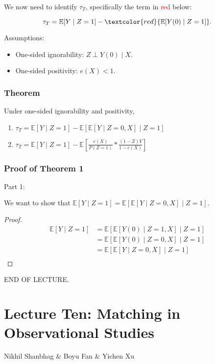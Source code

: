 We now need to identify $\tau_T$, specifically the term in \textcolor{red}{red} below:

\[\tau_T=\mathbb{E}[Y\mid Z=1]-\textcolor{red}{\mathbb{E}[Y(0)\mid Z=1]}.\]

Assumptions:
\begin{itemize}
    \item One-sided ignorability: $Z\perp Y(0)\mid X$.
    \item One-sided positivity: $e(X)<1$.
\end{itemize}

\subsubsection{Theorem}

Under one-sided ignorability and positivity,
\begin{enumerate}
    \item $\tau_T=\mathbb{E}[Y\mid Z=1]-\mathbb{E}\left[\mathbb{E}[Y\mid Z=0,X]\mid Z=1\right]$
    \item $\tau_T=\mathbb{E}[Y\mid Z=1]-\mathbb{E}\left[\frac{e(X)}{P(Z=1)}*\frac{(1-Z)Y}{1-e(X)}\right]$
\end{enumerate}

\subsubsection{Proof of Theorem 1}

Part 1:

We want to show that $\mathbb{E}[Y\mid Z=1]=\mathbb{E}\left[\mathbb{E}[Y\mid Z=0,X]\mid Z=1\right]$.
\begin{proof}
\begin{align*}
    \mathbb{E}[Y\mid Z=1]&=\mathbb{E}\left[\mathbb{E}[Y(0)\mid Z=1,X]\mid Z=1\right]\\
    &=\mathbb{E}\left[\mathbb{E}[Y(0)\mid Z=0,X]\mid Z=1\right]\\
    &=\mathbb{E}\left[\mathbb{E}[Y\mid Z=0,X]\mid Z=1\right]\\
\end{align*}
\end{proof}

END OF LECTURE.


\section{Lecture Ten: Matching in Observational Studies}
{Nikhil Shanbhag \& Boyu Fan \& Yichen Xu}

